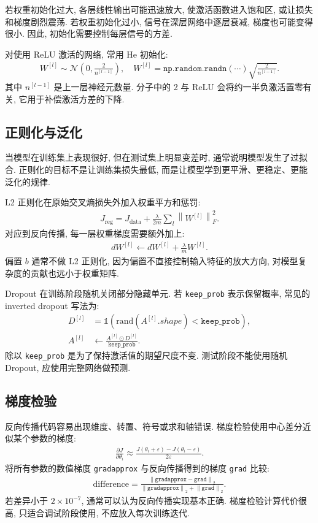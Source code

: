 \documentclass{../../nndlcourse}
\begin{document}
若权重初始化过大, 各层线性输出可能迅速放大, 使激活函数进入饱和区, 或让损失和梯度剧烈震荡. 若权重初始化过小, 信号在深层网络中逐层衰减, 梯度也可能变得很小. 因此, 初始化需要控制每层信号的方差.

对使用 ReLU 激活的网络, 常用 He 初始化:
\begin{align}
    W^{[l]} \sim \mathcal{N}\!\left(0,\frac{2}{n^{[l-1]}}\right),
    \quad
    W^{[l]}=\texttt{np.random.randn}(\cdots)
    \sqrt{\frac{2}{n^{[l-1]}}}.
\end{align}
其中 $n^{[l-1]}$ 是上一层神经元数量. 分子中的 2 与 ReLU 会将约一半负激活置零有关, 它用于补偿激活方差的下降.

\subsection{正则化与泛化}

当模型在训练集上表现很好, 但在测试集上明显变差时, 通常说明模型发生了过拟合. 正则化的目标不是让训练集损失最低, 而是让模型学到更平滑、更稳定、更能泛化的规律.

L2 正则化在原始交叉熵损失外加入权重平方和惩罚:
\begin{align}
    J_{\mathrm{reg}} =
    J_{\mathrm{data}}
    + \frac{\lambda}{2m}\sum_l \left\|W^{[l]}\right\|_F^2 .
\end{align}
对应到反向传播, 每一层权重梯度需要额外加上:
\begin{align}
    dW^{[l]} \leftarrow dW^{[l]} + \frac{\lambda}{m}W^{[l]}.
\end{align}
偏置 $b$ 通常不做 L2 正则化, 因为偏置不直接控制输入特征的放大方向, 对模型复杂度的贡献也远小于权重矩阵.

Dropout 在训练阶段随机关闭部分隐藏单元. 若 \texttt{keep\_prob} 表示保留概率, 常见的 inverted dropout 写法为:
\begin{align}
    D^{[l]} &= \mathbb{1}\left(\mathrm{rand}(A^{[l]}.shape)<\texttt{keep\_prob}\right),\\
    A^{[l]} &\leftarrow \frac{A^{[l]}\odot D^{[l]}}{\texttt{keep\_prob}}.
\end{align}
除以 \texttt{keep\_prob} 是为了保持激活值的期望尺度不变. 测试阶段不能使用随机 Dropout, 应使用完整网络做预测.

\subsection{梯度检验}

反向传播代码容易出现维度、转置、符号或求和轴错误. 梯度检验使用中心差分近似某个参数的梯度:
\begin{align}
    \frac{\partial J}{\partial \theta_i}
    \approx
    \frac{J(\theta_i+\varepsilon)-J(\theta_i-\varepsilon)}
    {2\varepsilon}.
\end{align}
将所有参数的数值梯度 \texttt{gradapprox} 与反向传播得到的梯度 \texttt{grad} 比较:
\begin{align}
    \mathrm{difference}
    =
    \frac{\left\|\texttt{gradapprox}-\texttt{grad}\right\|_2}
    {\left\|\texttt{gradapprox}\right\|_2+\left\|\texttt{grad}\right\|_2}.
\end{align}
若差异小于 $2\times 10^{-7}$, 通常可以认为反向传播实现基本正确. 梯度检验计算代价很高, 只适合调试阶段使用, 不应放入每次训练迭代.
\end{document}
